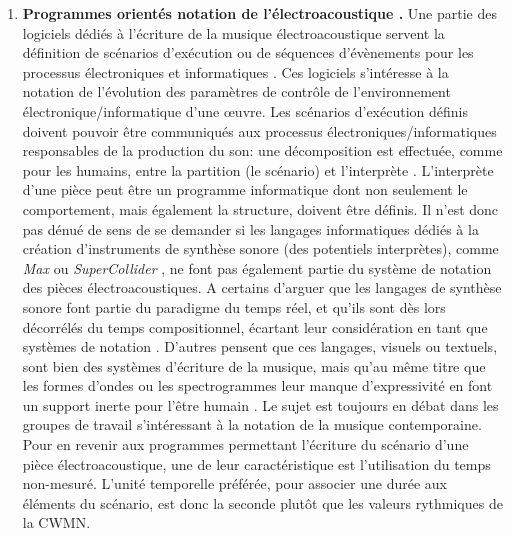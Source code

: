 \begin{enumerate}[label=(\arabic*)]
	\item \textbf{Programmes orientés \og notation de l'électroacoustique \fg.} Une partie des logiciels dédiés à l'écriture de la musique électroacoustique servent la définition de scénarios d'exécution ou de séquences d'évènements pour les processus électroniques et informatiques \cite{arias2017, coduys2003, cont2008}. Ces logiciels s'intéresse à la notation de l'évolution des paramètres de contrôle de l'environnement électronique/informatique d'une œuvre. Les scénarios d'exécution définis doivent pouvoir être communiqués aux processus électroniques/informatiques responsables de la production du son: une décomposition est effectuée, comme pour les humains, entre la partition (le scénario) et l'interprète \cite{pope1986}.
	L'interprète d'une pièce peut être un programme informatique dont non seulement le comportement, mais également la structure, doivent être définis. Il n'est donc pas dénué de sens de se demander si les langages informatiques dédiés à la création d'instruments de synthèse sonore (des potentiels interprètes), comme \textit{Max} \cite{puckette1991} ou \textit{SuperCollider} \cite{mccartney1996}, ne font pas également partie du système de notation des pièces électroacoustiques. A certains d'arguer que les langages de synthèse sonore font partie du paradigme du temps réel, et qu'ils sont dès lors décorrélés du temps compositionnel, écartant leur considération en tant que systèmes de notation \cite{risset1999}. D'autres pensent que ces langages, visuels ou textuels, sont bien des systèmes d'écriture de la musique, mais qu'au même titre que les formes d'ondes ou les spectrogrammes leur manque d'expressivité en font un support inerte pour l'être humain \cite{gottfried2017}.
	Le sujet est toujours en débat dans les groupes de travail s'intéressant à la notation de la musique contemporaine.
	Pour en revenir aux programmes permettant l'écriture du \og scénario \fg d'une pièce électroacoustique, une de leur caractéristique est l'utilisation du temps non-mesuré. L'unité temporelle préférée, pour associer une durée aux éléments du scénario, est donc la seconde plutôt que les valeurs rythmiques de la CWMN.
	

\end{enumerate}

